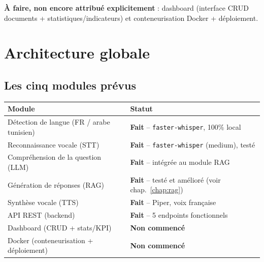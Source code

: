 \documentclass[11pt,a4paper]{report}
\begin{document}
\begin{noteinfo}
\textbf{À faire, non encore attribué explicitement} : dashboard (interface CRUD documents
+ statistiques/indicateurs) et conteneurisation Docker + déploiement.
\end{noteinfo}

\chapter{Architecture globale}

\section{Les cinq modules prévus}

\begin{center}
\end{center}

\begin{center}
\begin{tabular}{@{}p{4.2cm}p{9.5cm}@{}}
\toprule
\textbf{Module} & \textbf{Statut} \\
\midrule
Détection de langue (FR / arabe tunisien) & \textbf{Fait} -- \texttt{faster-whisper}, 100\% local \\
Reconnaissance vocale (STT) & \textbf{Fait} -- \texttt{faster-whisper} (medium), testé \\
Compréhension de la question (LLM) & \textbf{Fait} -- intégrée au module RAG \\
Génération de réponses (RAG) & \textbf{Fait} -- testé et amélioré (voir chap.~\ref{chap:rag}) \\
Synthèse vocale (TTS) & \textbf{Fait} -- Piper, voix française \\
API REST (backend) & \textbf{Fait} -- 5 endpoints fonctionnels \\
Dashboard (CRUD + stats/KPI) & \textbf{Non commencé} \\
Docker (conteneurisation + déploiement) & \textbf{Non commencé} \\
\bottomrule
\end{tabular}
\end{center}
\end{document}
